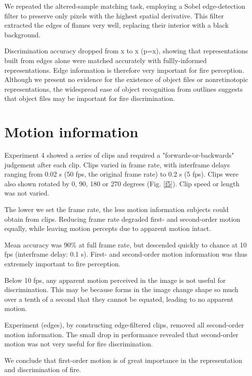 \documentclass[a4paper]{article}
\begin{document}
We repeated the altered-sample matching task, employing a Sobel edge-detection filter\cite{kittler1983accuracy} to preserve only pixels with the highest spatial derivative. This filter extracted the edges of flames very well, replacing their interior with a black background.

Discrimination accuracy dropped from x to x (p=x), showing that representations built from edges alone were matched accurately with fullly-informed representations. Edge information is therefore very important for fire perception. Although we present no evidence for the existence of object files or nonretinotopic representations, the widespread ease of object recognition from outlines suggests that object files may be important for fire discrimination.



\section{Motion information}


Experiment 4 showed a series of clips and required a "forwards-or-backwards" judgement after each clip. Clips varied in frame rate, with interframe delays ranging from 0.02 s (50 fps, the original frame rate) to 0.2 s (5 fps). Clips were also shown rotated by 0, 90, 180 or 270 degrees (Fig. \ref{f5}). Clip speed or length was not varied.

The lower we set the frame rate, the less motion information subjects could obtain from clips. Reducing frame rate degraded first- and second-order motion equally, while leaving motion percepts due to apparent motion intact.

Mean accuracy was 90\% at full frame rate, but descended quickly to chance at 10 fps (interframe delay: 0.1 s). First- and second-order motion information was thus extremely important to fire perception.

Below 10 fps, any apparent motion perceived in the image is not useful for discrimination. This may be because forms in the image change shape so much over a tenth of a second that they cannot be equated, leading to no apparent motion.

Experiment (edges), by constructing edge-filtered clips, removed all second-order motion information. The small drop in performance revealed that second-order motion was not very useful for fire discrimination.

We conclude that first-order motion is of great importance in the representation and discrimination of fire.
\end{document}
